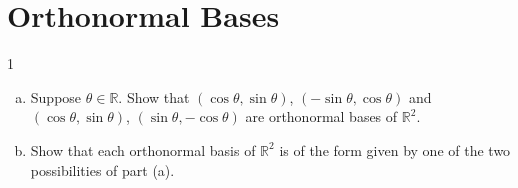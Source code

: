 \documentclass{extarticle}
\newenvironment{problem}[1]{\begin{prob*}{#1}{}}{\end{prob*}}
\newcommand{\R}{\mathbb{R}}
\begin{document}
\section{Orthonormal Bases}

\begin{problem}{1}
\begin{enumerate}[(a)]
\item Suppose $\theta\in \R$.  Show that $(\cos\theta, \sin\theta)$, $(-\sin\theta,\cos\theta)$ and $(\cos\theta, \sin\theta)$, $(\sin\theta,-\cos\theta)$ are orthonormal bases of $\R^2$.
\item Show that each orthonormal basis of $\R^2$ is of the form given by one of the two possibilities of part (a).
\end{enumerate}
\end{problem}
\end{document}
